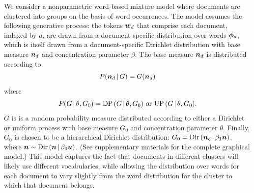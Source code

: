 \documentclass{article}
\begin{document}
We consider a nonparametric word-based mixture model where documents
are clustered into groups on the basis of word occurrences. The model
assumes the following generative process: the tokens $\boldsymbol{w}_d$ that
comprise each document, indexed by $d$, are drawn from a
document-specific distribution over words $\boldsymbol{\phi}_d$, which is itself
drawn from a document-specific Dirichlet distribution with base
measure $\boldsymbol{n}_d$ and concentration parameter $\beta$. The base measure
$\boldsymbol{n}_d$ is distributed according to
\begin{equation*}
P(\boldsymbol{n}_d \,|\, G) = G(\boldsymbol{n}_d)
\end{equation*}
where
\begin{equation*}
P(G \,|\, \theta, G_0) = \textrm{DP}\,(G \,|\, \theta, G_0) \textrm{ or }
\textrm{UP}\,(G \,|\, \theta, G_0).
\end{equation*}
$G$ is is a random probability measure distributed according to either
a Dirichlet or uniform process with base measure $G_0$ and
concentration parameter $\theta$. Finally, $G_0$ is chosen to be a
hierarchical Dirichlet distribution: $G_0 = \textrm{Dir}\,(\boldsymbol{n}_{c} \,|\,
\beta_1 \boldsymbol{n})$, where $\boldsymbol{n} \sim \textrm{Dir}\,(\boldsymbol{n} \,|\, \beta_0
\boldsymbol{u})$. (See supplementary materials for the complete graphical model.)
This model captures the fact that documents in different clusters will
likely use different vocabularies, while allowing the distribution
over words for each document to vary slightly from the word
distribution for the cluster to which that document belongs.
\end{document}
